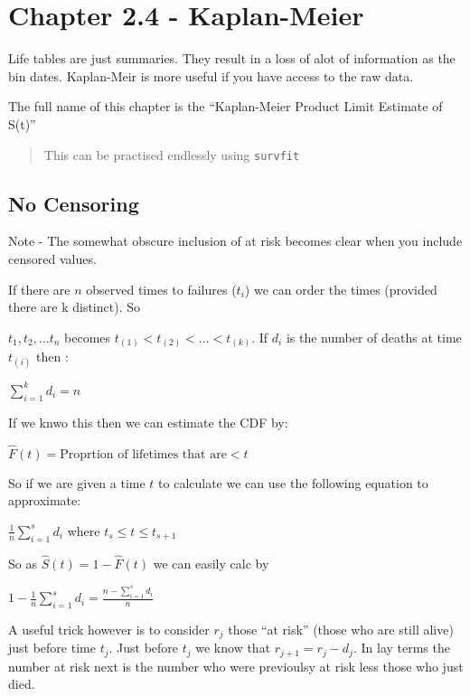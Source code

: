 \documentclass[
  letterpaper,
  DIV=11,
  numbers=noendperiod]{scrreprt}
\begin{document}
\hypertarget{chapter-2.4---kaplan-meier}{%
\section{Chapter 2.4 - Kaplan-Meier}\label{chapter-2.4---kaplan-meier}}

Life tables are just summaries. They result in a loss of alot of
information as the bin dates. Kaplan-Meir is more useful if you have
access to the raw data.

The full name of this chapter is the ``Kaplan-Meier Product Limit
Estimate of S(t)''

\begin{quote}
This can be practised endlessly using \texttt{survfit}
\end{quote}

\hypertarget{no-censoring}{%
\subsection{No Censoring}\label{no-censoring}}

Note - The somewhat obscure inclusion of at risk becomes clear when you
include censored values.

If there are \(n\) observed times to failures (\(t_i\)) we can order the
times (provided there are k distinct). So

\(t_1, t_2, ... t_n\) becomes \(t_{(1)} < t_{(2)} < ... < t_{(k)}\). If
\(d_i\) is the number of deaths at time \(t_{(i)}\) then :

\(\sum_{i=1}^k d_i = n\)

If we knwo this then we can estimate the CDF by:

\(\hat{F}(t) = \text{Proprtion of lifetimes that are} < t\)

So if we are given a time \(t\) to calculate we can use the following
equation to approximate:

\(\frac{1}{n} \sum^{s}_{i=1}d_i\) where \(t_s\leq t \leq t_{s+1}\)

So as \(\hat{S}(t) = 1 - \hat{F}(t)\) we can easily calc by

\(1 - \frac{1}{n} \sum^{s}_{i=1}d_i = \frac{n - \sum^{s}_{i=1}d_i }{n}\)

A useful trick however is to consider \(r_j\) those ``at risk'' (those
who are still alive) just before time \(t_j\). Just before \(t_j\) we
know that \(r_{j+1} = r_j - d_j\). In lay terms the number at risk next
is the number who were previoulsy at risk less those who just died.
\end{document}
